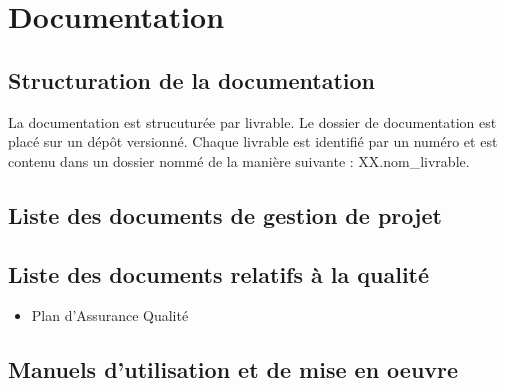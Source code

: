 \section{Documentation}

\subsection{Structuration de la documentation}
La documentation est strucuturée par livrable. Le dossier de documentation est placé sur un dépôt versionné.
Chaque livrable est identifié par un numéro et est contenu dans un dossier nommé de la manière suivante : XX.nom\_livrable.


\subsection{Liste des documents de gestion de projet}


\subsection{Liste des documents relatifs à la qualité}

\begin{itemize}
    \item Plan d'Assurance Qualité
\end{itemize}

\subsection{Manuels d'utilisation et de mise en oeuvre}

\vfill
\pagebreak
